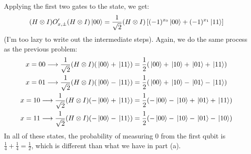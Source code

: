 \documentclass[10pt]{article}
\begin{document}
			\begin{solution}
				Applying the first two gates to the state, we get: 
				\[
					(H \otimes I) O'_{x, \pm} (H\otimes I) \ket*{00} = \frac{1}{\sqrt{2} }(H \otimes I) 
					\left[ (-1)^{x_0}\ket*{00} + (-1)^{x_1}\ket*{11} \right] 
				\] 
				(I'm too lazy to write out the intermediate steps). Again, we do the same process as the previous 
				problem:
				\begin{align*}
					x = 00 \longrightarrow \frac{1}{\sqrt{2} }(H \otimes I)(\ket*{00} + \ket*{11}) 
					&= \frac{1}{2}(\ket*{00} + \ket*{10} + \ket*{01} + \ket*{11})\\
					x = 01 \longrightarrow \frac{1}{\sqrt{2} }(H \otimes I)(\ket*{00} - \ket*{11})
					&= \frac{1}{2}(\ket*{00} + \ket*{10} - \ket*{01} - \ket*{11}) \\
					x = 10 \longrightarrow \frac{1}{\sqrt{2} }(H \otimes I)(-\ket*{00} + \ket*{11})
					&= \frac{1}{2}(-\ket*{00} - \ket*{10} + \ket*{01} + \ket*{11}) \\
					x = 11 \longrightarrow \frac{1}{\sqrt{2} }(H \otimes I)(-\ket*{00} - \ket*{11})
					&= \frac{1}{2}(-\ket*{00} - \ket*{10} - \ket*{01} - \ket*{10}) 
				\end{align*}
				In all of these states, the probability of measuring 0 from the first qubit is \( \frac{1}{4} 
				+ \frac{1}{4} = \frac{1}{2}\), which is different than what we have in part (a). 
			\end{solution}

	\pagebreak
\end{document}
